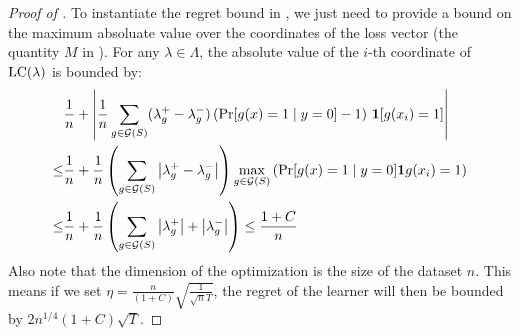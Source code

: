 \learneregret*

\begin{proof}[Proof of ]
  To instantiate the regret bound in , we just
  need to provide a bound on the maximum absoluate value over the
  coordinates of the loss vector (the quantity $M$ in
  ). For any $\lambda\in \Lambda$, the absolute
  value of the $i$-th coordinate of $\mathrm{LC}(\lambda)$ is bounded by:
  \begin{align*}
    &\frac{1}{n} + \left|\frac{1}{n}\sum_{g\in \mathcal{G}(S)}
      (\lambda_g^+ - \lambda_g^-) \left(\Pr[g(x) = 1\mid y = 0] -  1\right)
      \, \mathbf{1}[g(x_i) = 1]\right|\\
    \leq & \frac{1}{n} + \frac{1}{n} \left(\sum_{g\in \mathcal{G}(S)}\left| \lambda_g^+ - \lambda_g^- \right|\right) \max_{g\in \mathcal{G}(S)} \left( \Pr[g(x) = 1\mid y=0] \mathbf{1}g(x_i)=1 \right)\\
    \leq &\frac{1}{n} + \frac{1}{n} \left(\sum_{g\in \mathcal{G}(S)}\left| \lambda_g^+ \right| +\left| \lambda_g^- \right|\right) \leq \frac{1 + C}{n}
  \end{align*}
  Also note that the dimension of the optimization is the size of the
  dataset $n$. This means if we set
  $\eta = \frac{n}{(1+C)} \sqrt{\frac{1}{\sqrt{n} T}}$, the regret of
  the learner will then be bounded by $2 n^{1/4} {(1+C)} \sqrt{T}$.
\end{proof}


\samplingerr*

